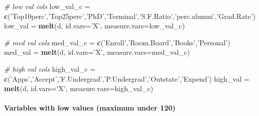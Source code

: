 \documentclass[]{article}
\newenvironment{Shaded}{\begin{snugshade}}{\end{snugshade}}
\newcommand{\CommentTok}[1]{\textcolor[rgb]{0.56,0.35,0.01}{\textit{#1}}}
\newcommand{\DataTypeTok}[1]{\textcolor[rgb]{0.13,0.29,0.53}{#1}}
\newcommand{\KeywordTok}[1]{\textcolor[rgb]{0.13,0.29,0.53}{\textbf{#1}}}
\newcommand{\NormalTok}[1]{#1}
\newcommand{\OperatorTok}[1]{\textcolor[rgb]{0.81,0.36,0.00}{\textbf{#1}}}
\newcommand{\StringTok}[1]{\textcolor[rgb]{0.31,0.60,0.02}{#1}}
\let\oldparagraph\paragraph
\renewcommand{\paragraph}[1]{\oldparagraph{#1}\mbox{}}
\begin{document}
\begin{Shaded}
\begin{Highlighting}[]
\CommentTok{# low val cols}
\NormalTok{low_val_c =}\StringTok{ }\KeywordTok{c}\NormalTok{(}\StringTok{'Top10perc'}\NormalTok{,}\StringTok{'Top25perc'}\NormalTok{,}\StringTok{'PhD'}\NormalTok{,}\StringTok{'Terminal'}\NormalTok{,}\StringTok{'S.F.Ratio'}\NormalTok{,}\StringTok{'perc.alumni'}\NormalTok{,}\StringTok{'Grad.Rate'}\NormalTok{)}
\NormalTok{low_val =}\StringTok{ }\KeywordTok{melt}\NormalTok{(d, }\DataTypeTok{id.vars=}\StringTok{'X'}\NormalTok{, }\DataTypeTok{measure.vars=}\NormalTok{low_val_c)}

\CommentTok{# med val cols}
\NormalTok{med_val_c =}\StringTok{ }\KeywordTok{c}\NormalTok{(}\StringTok{'Enroll'}\NormalTok{,}\StringTok{'Room.Board'}\NormalTok{,}\StringTok{'Books'}\NormalTok{,}\StringTok{'Personal'}\NormalTok{)}
\NormalTok{med_val =}\StringTok{ }\KeywordTok{melt}\NormalTok{(d, }\DataTypeTok{id.vars=}\StringTok{'X'}\NormalTok{, }\DataTypeTok{measure.vars=}\NormalTok{med_val_c)}

\CommentTok{# high val cols}
\NormalTok{high_val_c =}\StringTok{ }\KeywordTok{c}\NormalTok{(}\StringTok{'Apps'}\NormalTok{,}\StringTok{'Accept'}\NormalTok{,}\StringTok{'F.Undergrad'}\NormalTok{,}\StringTok{'P.Undergrad'}\NormalTok{,}\StringTok{'Outstate'}\NormalTok{,}\StringTok{'Expend'}\NormalTok{)}
\NormalTok{high_val =}\StringTok{ }\KeywordTok{melt}\NormalTok{(d, }\DataTypeTok{id.vars=}\StringTok{'X'}\NormalTok{, }\DataTypeTok{measure.vars=}\NormalTok{high_val_c)}
\end{Highlighting}
\end{Shaded}

\hypertarget{variables-with-low-values-maximum-under-120}{%
\paragraph{Variables with low values (maximum under
120)}\label{variables-with-low-values-maximum-under-120}}

\begin{Shaded}
\end{Shaded}
\end{document}
